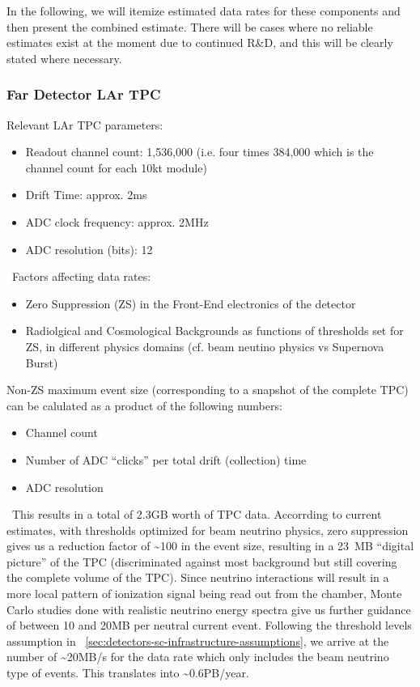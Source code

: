 In the following, we will itemize estimated data rates for these components and then present the combined estimate.
There will be cases where no reliable estimates exist at the moment due to continued R\&D, and this will be clearly stated where necessary.

\subsubsection{Far Detector LAr TPC}
Relevant  LAr TPC parameters:
\begin{itemize}
\item Readout channel count: 1,536,000 (i.e. four times 384,000 which is the channel count for each 10kt module)
\item Drift Time: approx. 2ms
\item ADC clock frequency: approx. 2MHz
\item ADC resolution (bits): 12
\end{itemize}
\
Factors affecting data rates:
\begin{itemize}
\item Zero Suppression (ZS)  in the Front-End electronics of the detector
\item Radiolgical and Cosmological Backgrounds as functions of thresholds set for ZS, in different physics domains (cf. beam neutino physics vs Supernova Burst)
\end{itemize}

Non-ZS maximum event size (corresponding to a snapshot of the complete TPC) can be calulated as a product of the following numbers:
\begin{itemize}
\item Channel count
\item Number of ADC ``clicks'' per total drift (collection) time
\item ADC resolution
\end{itemize}
\
This results in a total of 2.3GB worth of TPC data. Accorrding to current estimates, with thresholds optimized for beam neutrino physics, zero suppression
gives us a reduction factor of \textasciitilde 100 in the event size, resulting in a 23~MB ``digital picture'' of the TPC (discriminated against most background
but still covering the complete volume of the TPC). Since neutrino interactions will result in a more local pattern of ionization signal being read out
from the chamber, Monte Carlo studies done with realistic neutrino energy spectra give us further guidance of between 10 and 20MB per neutral current event.
Following the threshold levels assumption in ~\ref{sec:detectors-sc-infrastructure-assumptions}, we arrive at the number of \textasciitilde 20MB/s for the data rate
which only includes the beam neutrino type of events. This translates into \textasciitilde 0.6PB/year.

